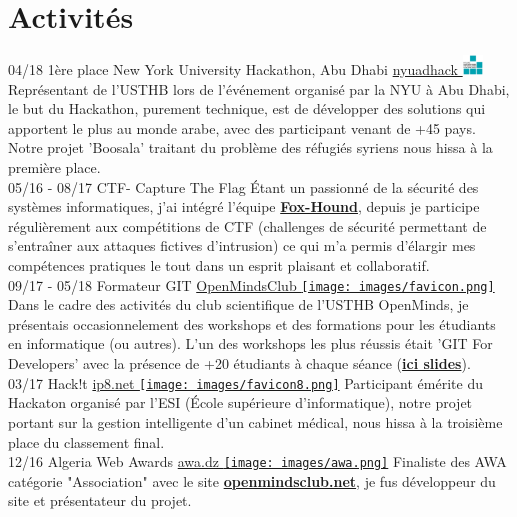 \documentclass[]{friggeri-cv}
\begin{document}
\section{Activités}
\begin{entrylist}
  \entry
    {04/18}
    {1ère place New York University Hackathon, Abu Dhabi}
    {\href{http://sites.nyuad.nyu.edu/hackathon/}{nyuadhack \includegraphics[width=15pt]{images/nyuad.png}}}
    {Représentant de l'USTHB lors de l’événement organisé par la NYU à Abu Dhabi, le but du Hackathon, purement technique, est de développer des solutions qui apportent le plus au monde arabe, avec des participant venant de +45 pays. Notre projet 'Boosala' traitant du problème des réfugiés syriens nous hissa à la première place.\\}
  \entry
    {05/16 - 08/17}
    {CTF- Capture The Flag}
    {}
    {Étant un passionné de la sécurité des systèmes informatiques, j'ai intégré l'équipe \href{https://web.facebook.com/F0xHo2Nd/}{\textbf{Fox-Hound}}, depuis je participe régulièrement aux compétitions de CTF (challenges de sécurité permettant de s’entraîner aux attaques fictives d’intrusion) ce qui m'a permis d'élargir mes compétences pratiques le tout dans un esprit plaisant et collaboratif.\\}
  \entry
    {09/17 - 05/18}
    {Formateur GIT}
    {\href{http://www.openmindsclub.net}{OpenMindsClub \texttt{[image: images/favicon.png]}}}
    {Dans le cadre des activités du club scientifique de l'USTHB OpenMinds, je présentais occasionnelement des workshops et des formations pour les étudiants en informatique (ou autres). L'un des workshops les plus réussis était 'GIT For Developers' avec la présence de +20 étudiants à chaque séance (\href{https://docs.google.com/presentation/d/1EpSSNWrd8AF35Cn7sH5rNGCtWxRJZ9qw9re5kcDOY0o/edit?usp=sharing}{\textbf{ici slides}}).\\}
  \entry
    {03/17}
    {Hack!t}
    {\href{https://www.openmindsclub.net/}{ip8.net \texttt{[image: images/favicon8.png]}}}
    {Participant émérite du Hackaton organisé par l'ESI (École supérieure d'informatique), notre projet portant sur la gestion intelligente d'un cabinet médical, nous hissa à la troisième place du classement final.\\}
  \entry
    {12/16}
    {Algeria Web Awards}
    {\href{https://vote.awa.dz/detail/770/}{awa.dz \texttt{[image: images/awa.png]}}}
    {Finaliste des AWA catégorie "Association" avec le site \href{http://www.openmindsclub.net/}{\textbf{openmindsclub.net}}, je fus développeur du site et présentateur du projet.\\
}
\end{entrylist}
\end{document}
